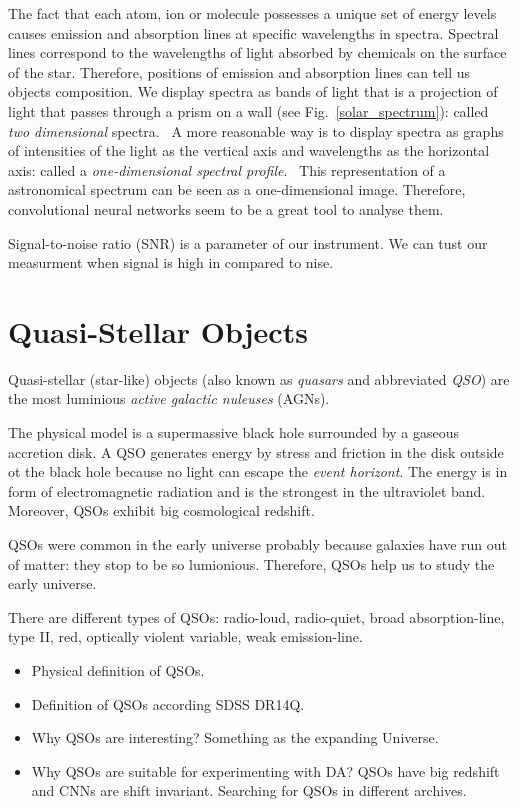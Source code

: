 The fact that each atom, ion or molecule possesses a unique set of energy levels
causes emission and absorption lines at specific wavelengths in spectra.
Spectral lines correspond to the wavelengths of light absorbed by chemicals on the surface of the star.
Therefore, positions of emission and absorption lines can tell us objects composition.
We display spectra as bands of light that is a projection of light that passes through a prism on a wall
(see Fig.~\ref{solar_spectrum}):
called \textit{two dimensional} spectra.~\cite{cochard2018}
A more reasonable way is to display spectra as graphs of intensities of the light as the vertical axis and wavelengths as the horizontal axis:
called a \textit{one-dimensional spectral profile}.~\cite{cochard2018}
This representation of a astronomical spectrum can be seen as a one-dimensional image.
Therefore, convolutional neural networks seem to be a great tool to analyse them.~\cite{bennett2005}

Signal-to-noise ratio (SNR) is a parameter of our instrument.
We can tust our measurment when signal is high in compared to nise.~\cite{cochard2018}

\section{Quasi-Stellar Objects}

Quasi-stellar (star-like) objects (also known as \textit{quasars} and abbreviated \textit{QSO}) are the most luminious \textit{active galactic nuleuses} (AGNs).~\cite{beckmann2013}

The physical model is a supermassive black hole surrounded by a gaseous accretion disk.
A QSO generates energy by stress and friction in the disk outside ot the black hole because no light can escape the \textit{event horizont}.
The energy is in form of electromagnetic radiation and is the strongest in the ultraviolet band.
Moreover, QSOs exhibit big cosmological redshift.

QSOs were common in the early universe probably because galaxies have run out of matter: they stop to be so lumionious.
Therefore, QSOs help us to study the early universe.

There are different types of QSOs: radio-loud, radio-quiet, broad absorption-line, type II, red, optically violent variable, weak emission-line.

\begin{itemize}
	\item Physical definition of QSOs.
	\item Definition of QSOs according SDSS DR14Q.
	\item Why QSOs are interesting? Something as the expanding Universe.
	\item Why QSOs are suitable for experimenting with DA?
		QSOs have big redshift and CNNs are shift invariant.
		Searching for QSOs in different archives.
\end{itemize}

